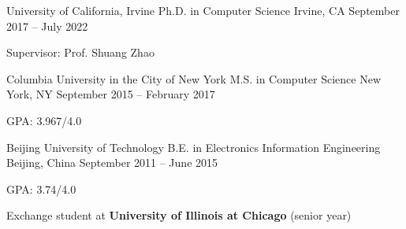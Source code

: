 
\begin{cventries}

  \cventry
    {University of California, Irvine}
    {Ph.D. in Computer Science}
    {Irvine, CA}
    {September 2017 -- July 2022}
    {
      \begin{cvitems}
        \item{Supervisor: Prof. Shuang Zhao}
      \end{cvitems}
    }

  \cventry
    {Columbia University in the City of New York}
    {M.S. in Computer Science}
    {New York, NY}
    {September 2015 -- February 2017}
    {     
    	\begin{cvitems}
    		\item{GPA: 3.967/4.0}
    	\end{cvitems}
	}

  \cventry
	{Beijing University of Technology}
	{B.E. in Electronics Information Engineering}
	{Beijing, China}
	{September 2011 -- June 2015}
	{   
		\begin{cvitems}
			\item{GPA: 3.74/4.0}
			\item{Exchange student at \textbf{University of Illinois at Chicago} (senior year)}
		\end{cvitems}
	}


\end{cventries}
